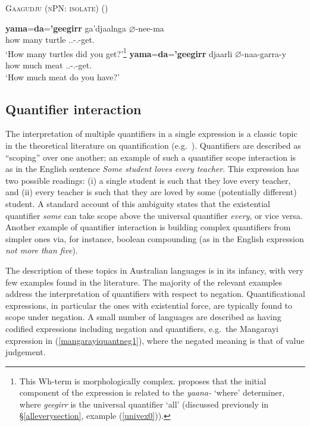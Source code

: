 \documentclass[12pt,egregdoesnotlikesansseriftitles]{scrartcl}
\begin{document}
\begin{exe}
  \ex \textsc{Gaagudju (nPN: isolate)} \hfill (\citealt[232]{harvey92})
  \begin{xlist}
    \ex \gll \textbf{yama}=\textbf{da}=\textbf{'geegirr} ga'djaalnga $\varnothing$-nee-ma\\
    {how many} turtle \Third.\Cli.\Abs-\Second.\Erg-get.\Pp\\
    \glt `How many turtles did you get?'\footnote{This Wh-term is morphologically complex. \citet[232]{harvey92} proposes that the initial component of the expression is related to the \textit{yaana-} `where' determiner, where \textit{geegirr} is the universal quantifier `all' (discussed previously in \S\ref{alleverysection}, example (\ref{univex0})).}
    \ex \gll \textbf{yama}=\textbf{da}=\textbf{'geegirr} djaarli $\varnothing$-naa-garra-y\\
    {how much} meat \Third.\Cli.\Abs-\Second.\Erg-get.\Prs\\
    \glt `How much meat do you have?' %
  \end{xlist}
\end{exe}

\subsection{Quantifier interaction}
\label{sec:qfrscope}
The interpretation of multiple quantifiers in a single expression is a classic topic in the theoretical literature on quantification (e.g.\ \citealt{szab97}). Quantifiers are described as ``scoping'' over one another; an example of such a quantifier scope interaction is as in the English sentence \textit{Some student loves every teacher}. This expression has two possible readings: (i) a single student is such that they love every teacher, and (ii) every teacher is such that they are loved by some (potentially different) student. A standard account of this ambiguity states that the existential quantifier \textit{some} can take scope above the universal quantifier \textit{every}, or vice versa. Another example of quantifier interaction is building complex quantifiers from simpler ones via, for instance, boolean compounding (as in the English expression \textit{not more than five}).

The description of these topics in Australian languages is in its infancy, with very few examples found in the literature. The majority of the relevant examples address the interpretation of quantifiers with respect to negation. Quantificational expressions, in particular the ones with existential force, are typically found to scope under negation. A small number of languages are described as having codified expressions including negation and quantifiers, e.g.\ the Mangarayi expression in (\ref{mangarayiquantneg1}), where the negated meaning is that of value judgement.
\end{document}

